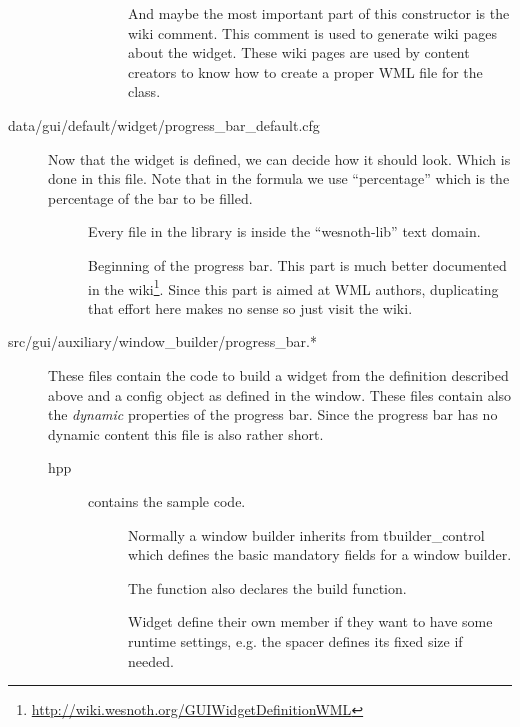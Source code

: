 \begin{description}
\begin{description}
\begin{description}
		And maybe the most important part of this constructor is the wiki
		comment. This comment is used to generate wiki pages about the widget.
		These wiki pages are used by content creators to know how to create a
		proper WML file for the class.
	\end{description}
\end{description}

\item[data/gui/default/widget/progress\_bar\_default.cfg]
	Now that the widget is defined, we can decide how it should look. Which is
	done in this file. Note that in the formula we use ``percentage'' which is
	the percentage of the bar to be filled.

	\begin{description}
	\item[] Every file in the library
		is inside the ``wesnoth-lib'' text domain.

	\item[]
		Beginning of the progress bar. This part is much better documented in
		the wiki\footnote{\url{http://wiki.wesnoth.org/GUIWidgetDefinitionWML}}. 
		Since this part is aimed at WML authors, duplicating that effort here
		makes no sense so just visit the wiki.

	\end{description}

\item[src/gui/auxiliary/window\_builder/progress\_bar.*]
	These files contain the code to build a widget from the definition described
	above and a config object as defined in the window. These files contain also the
	\emph{dynamic} properties of the progress bar. Since the progress bar has no
	dynamic content this file is also rather short.

\begin{description}
\item[hpp]  contains the sample code. 
	\begin{description}
	\item[] Normally a
		window builder inherits from tbuilder\_control which defines the
		basic mandatory fields for a window builder.

		The function also declares the build function.

		Widget define their own member if they want to have some runtime
		settings, e.g. the spacer defines its fixed size if needed.
	\end{description}


\end{description}
\end{description}

